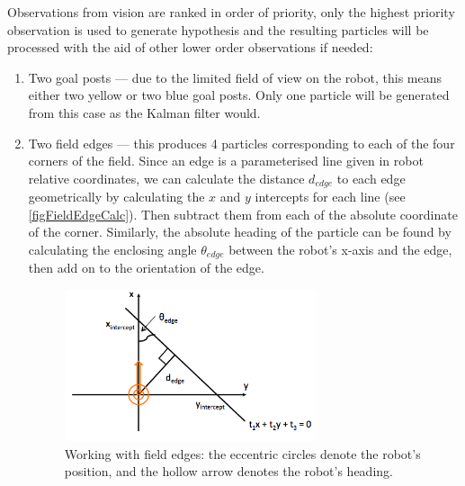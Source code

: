 \documentclass[pdftex,11pt,a4paper]{report}
\begin{document}
Observations from vision are ranked in order of priority, only the highest priority observation is used to generate hypothesis and the resulting particles will be processed with the aid of other lower order observations if needed:
\begin{enumerate}
  \item Two goal posts --- due to the limited field of view on the robot, this means either two yellow or two blue goal posts. Only one particle will be generated from this case as the Kalman filter would.
  \item Two field edges --- this produces 4 particles corresponding to each of the four corners of the field. Since an edge is a parameterised line given in robot relative coordinates, we can calculate the distance $d_{edge}$ to each edge geometrically by calculating the $x$ and $y$ intercepts for each line (see \autoref{figFieldEdgeCalc}). Then subtract them from each of the absolute coordinate of the corner. Similarly, the absolute heading of the particle can be found by calculating the enclosing angle $\theta_{edge}$ between the robot's x-axis and the edge, then add on to the orientation of the edge.
\begin{figure} [ht]
\centering
\includegraphics[width=0.7\textwidth]{figures/EdgeCalculations.png}
\caption{Working with field edges: the eccentric circles denote the robot's position, and the hollow arrow denotes the robot's heading.} \label{figFieldEdgeCalc}
\end{figure}



\end{enumerate}
\end{document}
